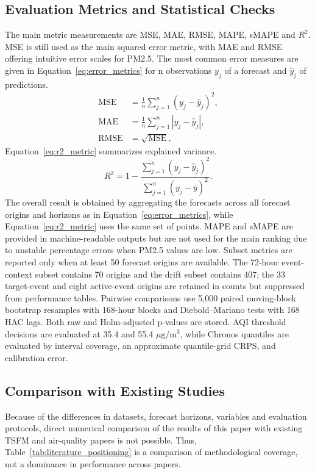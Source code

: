 \documentclass{ieeeaccess}
\begin{document}
\subsection{Evaluation Metrics and Statistical Checks}
The main metric measurements are MSE, MAE, RMSE, MAPE, sMAPE and $R^2$. MSE is still used as the main squared error metric, with MAE and RMSE offering intuitive error scales for PM2.5. The most common error measures are given in Equation~\eqref{eq:error_metrics} for n observations $y_{j}$ of a forecast and $\hat{y}_j$ of predictions.
\begin{equation}
\begin{aligned}
\operatorname{MSE}&=\frac{1}{n}\sum_{j=1}^{n}(y_j-\hat{y}_j)^2,\\
\operatorname{MAE}&=\frac{1}{n}\sum_{j=1}^{n}|y_j-\hat{y}_j|,\\
\operatorname{RMSE}&=\sqrt{\operatorname{MSE}},
\end{aligned}
\label{eq:error_metrics}
\end{equation}
Equation~\eqref{eq:r2_metric} summarizes explained variance.
\begin{equation}
R^2=1-\frac{\sum_{j=1}^{n}(y_j-\hat{y}_j)^2}
{\sum_{j=1}^{n}(y_j-\bar{y})^2}.
\label{eq:r2_metric}
\end{equation}
The overall result is obtained by aggregating the forecasts across all forecast origins and horizons as in Equation~\eqref{eq:error_metrics}, while Equation~\eqref{eq:r2_metric} uses the same set of points. MAPE and sMAPE are provided in machine-readable outputs but are not used for the main ranking due to unstable percentage errors when PM2.5 values are low. Subset metrics are reported only when at least 50 forecast origins are available. The 72-hour event-context subset contains 70 origins and the drift subset contains 407; the 33 target-event and eight active-event origins are retained in counts but suppressed from performance tables. Pairwise comparisons use 5,000 paired moving-block bootstrap resamples with 168-hour blocks and Diebold--Mariano tests with 168 HAC lags. Both raw and Holm-adjusted p-values are stored. AQI threshold decisions are evaluated at 35.4 and 55.4 $\mu\mathrm{g}/\mathrm{m}^3$, while Chronos quantiles are evaluated by interval coverage, an approximate quantile-grid CRPS, and calibration error.

\subsection{Comparison with Existing Studies}
Because of the differences in datasets, forecast horizons, variables and evaluation protocols, direct numerical comparison of the results of this paper with existing TSFM and air-quality papers is not possible. Thus, Table~\ref{tab:literature_positioning} is a comparison of methodological coverage, not a dominance in performance across papers.
\end{document}
